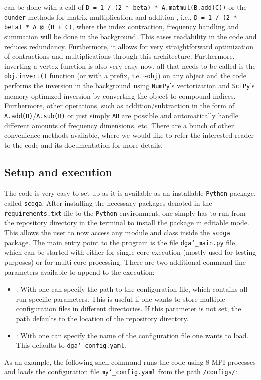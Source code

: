 \documentclass[../../main.tex]{subfiles}
\begin{document}
can be done with a call of \texttt{D = 1 / (2 * beta) * A.matmul(B.add(C))} or the \texttt{dunder} methods for matrix multiplication  and addition \say{\texttt{+}}, i.e., \texttt{D = 1 / (2 * beta) * A @ (B + C)}, where the index contraction, frequency handling and summation will be done in the background. This eases readability in the code and reduces redundancy. Furthermore, it allows for very straightforward optimization of contractions and multiplications through this architecture. Furthermore, inverting a vertex function is also very easy now, all that needs to be called is the \texttt{obj.invert()} function (or with a \say{\sim} prefix, i.e. \texttt{\sim obj}) on any object and the code performs the inversion in the background using \texttt{NumPy}'s vectorization and \texttt{SciPy}'s memory-optimized inversion by converting the object to compound indices. Furthermore, other operations, such as addition/subtraction in the form of \texttt{A.add(B)}/\texttt{A.sub(B)} or just simply \texttt{A\pm B} are possible and automatically handle different amounts of frequency dimensions, etc. There are a bunch of other convenience methods available, where we would like to refer the interested reader to the code and its documentation for more details.


\subsection{Setup and execution}

The code is very easy to set-up as it is available as an installable \texttt{Python} package, called \texttt{scdga}. After installing the necessary packages denoted in the \texttt{requirements.txt} file to the \texttt{Python} environment, one simply has to run  from the repository directory in the terminal to install the package in editable mode. This allows the user to now access any module and class inside the \texttt{scdga} package. The main entry point to the program is the file \texttt{dga\char`_main.py} file, which can be started with either  for single-core execution (mostly used for testing purposes) or \mbox{} for multi-core processing. There are two additional command line parameters available to append to the execution:
\begin{itemize}
\item{}: With  one can specify the path to the configuration file, which contains all run-specific parameters. This is useful if one wants to store multiple configuration files in different directories. If this parameter is not set, the path defaults to the location of the repository directory.
\item{}: With  one can specify the name of the configuration file one wants to load. This defaults to \texttt{dga\char`_config.yaml}.
\end{itemize}
As an example, the following shell command runs the code using 8 MPI processes and loads the configuration file \texttt{my\char`_config.yaml} from the path \texttt{/configs/}:
\end{document}

